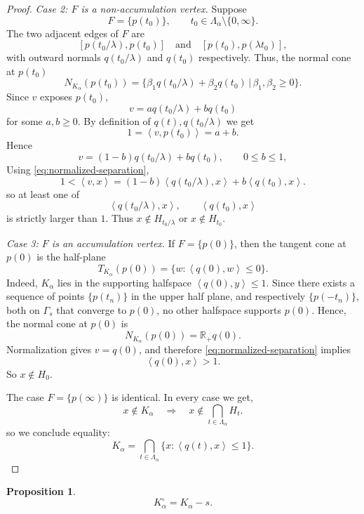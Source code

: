 \documentclass[12pt]{article}
\newtheorem{proposition}[theorem]{Proposition}
\theoremstyle{remark}
\newcommand{\ip}[2]{\left\langle #1,#2\right\rangle}
\begin{document}
\begin{proof}
\smallskip
\noindent\emph{Case 2: $F$ is a non-accumulation vertex.}
Suppose
\[
        F=\{p(t_0)\},
        \qquad
        t_0\in\Lambda_\alpha\setminus\{0,\infty\}.
\]
The two adjacent edges of $F$ are
\[
        [p(t_0/\lambda),p(t_0)]
        \quad\text{and}\quad
        [p(t_0),p(\lambda t_0)],
\]
with outward normals $q(t_0/\lambda)$ and $q(t_0)$ respectively.
Thus, the normal cone at $p(t_0)$
\[
        N_{K_\alpha}(p(t_0))
        =
      \{\beta_1 q(t_0/\lambda) + \beta_2 q(t_0) \, \vert \, \beta_1, \beta_2 \geq 0\}.
\]
Since $v$ exposes $p(t_0)$,
\[
        v=a q(t_0/\lambda)+b q(t_0)
\]
for some $a,b\ge0$. By definition of $q(t), q(t_0/\lambda)$ we get
\[
        1=\ip{v}{p(t_0)}=a+b.
\]
Hence
\[
        v=(1-b) q(t_0/\lambda)+b q(t_0),
        \qquad
        0 \leq b \leq 1,
\]
Using \eqref{eq:normalized-separation},
\[
        1<\ip{v}{x}
        =(1-b)\ip{q(t_0/\lambda)}{x}+b\ip{q(t_0)}{x}.
\]
so at least one of
\[
        \ip{q(t_0/\lambda)}{x},
        \qquad
        \ip{q(t_0)}{x}
\]
is strictly larger than $1$. Thus $x\notin H_{t_0/\lambda}$ or $x\notin H_{t_0}$.

\smallskip
\noindent\emph{Case 3: $F$ is an accumulation vertex.}
If $F=\{p(0)\}$, then the tangent cone at $p(0)$ is the half-plane
\[
        T_{K_\alpha}(p(0))=\{w:\ip{q(0)}{w}\le0\}.
\]
Indeed, $K_\alpha$ lies in the supporting halfspace $\ip{q(0)}{y}\le1$. Since there exists a sequence of points $\{p(t_n)\}$ in the upper half plane, and respectively $\{p(-t_n)\}$, both on $\Gamma_s$ that converge to $p(0)$, no other halfspace supports $p(0)$. Hence, the normal cone at $p(0)$ is
\[
        N_{K_\alpha}(p(0))=\mathbb R_+q(0).
\]
Normalization gives $v=q(0)$, and therefore \eqref{eq:normalized-separation} implies
\[
        \ip{q(0)}{x}>1.
\]
So $x\notin H_0$.

The case $F=\{p(\infty)\}$ is identical. 
In every case we get,
\[
        x\notin K_\alpha\quad\Longrightarrow\quad x\notin \bigcap_{t\in \Lambda_\alpha} H_t.
\]
so we conclude equality:
\begin{equation}\label{eq:halfspace-representation}
        K_\alpha
        =
        \bigcap_{t\in\Lambda_\alpha}\{x:\ip{q(t)}{x}\le1\}.
\end{equation}

\end{proof}

\begin{proposition}
\[
    K_{\alpha}^\circ = K_{\alpha} - s.
    \]
\end{proposition}
\end{document}
